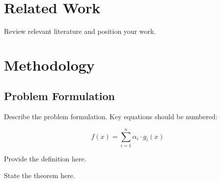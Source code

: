\documentclass[macnew, en]{manuscript}
\begin{document}
\section{Related Work}
\label{sec:related}

Review relevant literature and position your work.

\section{Methodology}
\label{sec:method}

\subsection{Problem Formulation}
\label{subsec:formulation}

Describe the problem formulation. Key equations should be numbered:

\begin{equation}
    f(x) = \sum_{i=1}^{n} \alpha_i \cdot g_i(x)
    \label{eq:example}
\end{equation}

\begin{definition}
    Provide the definition here.
\end{definition}

\begin{theorem}
    State the theorem here.
\end{theorem}
\end{document}
